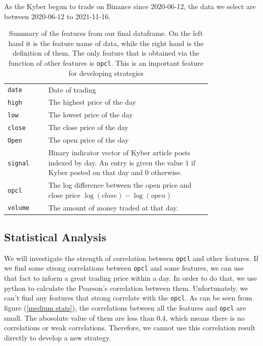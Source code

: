 \documentclass[twoside]{report}
\newcommand{\code}{\texttt}
\begin{document}
\begin{spacing}{1}
As the Kyber begun to trade on Binance since 2020-06-12, the data we select are between 2020-06-12 to 2021-11-16.


\begin{table}[!htp]
    \centering
    \begin{tabular}{|l|p{0.8\linewidth}|}
        \hline
        \code{date}  & Date of trading \\
        \code{high} & The highest price of the day\\
       \code{low}& The lowest price of the day\\
       \code{close} & The close price of the day\\
       \code{Open}& The open price of the day\\
         \code{signal} & Binary indicator vector of Kyber article posts indexed by day. An entry is given the value $1$ if Kyber posted on that day and $0$ otherwise.\\
         \code{opcl}  & The log difference between the open price and close price \code{$\log(close)-\log(open)$} \\
        \code{volume} & The amount of money traded at that day.\\ \hline
    \end{tabular}\vspace{2mm}
    \caption{Summary of the features from our final dataframe. On the left hand it is the feature name of data, while the right hand is the definition of them. The only feature that is obtained via the function of other features is \code{opcl}. This is an important feature for developing strategies }
    \label{tab:feature}
\end{table}


\subsection{Statistical Analysis}
We will investigate the strength of correlation between \code{opcl} and other features. If we find some strong correlations between \code{opcl} and some features, we can use that fact to inform a great trading price within a day. In order to do that, we use python to calculate the Pearson's correlation between them.   Unfortunately, we can't find any features that strong correlate with the \code{opcl}. As can be seen from figure (\ref{medium stats}), the correlations between all the features and \code{opcl} are small. The abosolute value of them are less than 0.4, which means there is no correlations or weak correlations. Therefore, we cannot use this correlation result directly to develop a new strategy.


\end{spacing}
\end{document}
